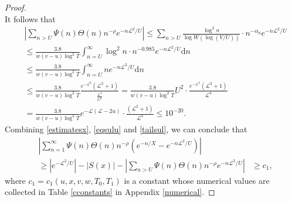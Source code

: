 \documentclass[reqno]{amsart}
\numberwithin{equation}{section}
\theoremstyle{remark}
\begin{document}
\begin{proof}
\[\]
It follows that
  \begin{equation}\label{tailsul}
    \begin{aligned}
        &\left|\sum_{ n> U}\Psi(n)\Theta(n) n^{-\rho}e^{-n \mathscr{L}^2 / U}\right|\le \sum_{ n> U}\frac{\log^2n}{\log W(\log(V/U))}\cdot n^{-\alpha_0} e^{-n \mathscr{L}^2 / U}\\&\le \frac{3.8}{w(v-u)\log^2T}\int_{n=U}^{\infty}\log^2n\cdot  n^{-0.985}e^{-n \mathscr{L}^2 / U}\text{d}n\\&\le  \frac{3.8}{w(v-u)\log^2T}\int_{n=U}^{\infty}ne^{-n \mathscr{L}^2 / U}\text{d}n\\&\le \frac{3.8}{w(v-u)\log^2T}\frac{e^{-\mathscr{L}^2}\left(\mathscr{L}^2+1\right)}{\frac{\mathscr{L}^4}{U^2}}= \frac{3.8}{w(v-u)\log^2T}U^{2}\cdot \frac{e^{-\mathscr{L}^2}\left(\mathscr{L}^2+1\right)}{\mathscr{L}^4}\\&= \frac{3.8}{w(v-u)\log^2T}e^{-\mathscr{L}(\mathscr{L}-2u)}\cdot \frac{\left(\mathscr{L}^2+1\right)}{\mathscr{L}^4}\le 10^{-20}.
    \end{aligned}
\end{equation}
Combining \eqref{estimatesx}, \eqref{eqsulu} and \eqref{tailsul}, we can conclude that
\begin{equation}\label{constinfront}
    \begin{aligned}
        &\left|\sum_{n=1}^{\infty}\Psi(n)\Theta(n) n^{-\rho}\left(e^{-n / X}-e^{-n \mathscr{L}^2 / U}\right)\right|\\&\ge |e^{- \mathscr{L}^2 / U}|-|S(x)|-\left|\sum_{ n> U}\Psi(n)\Theta(n) n^{-\rho}e^{-n \mathscr{L}^2 / U}\right|&\ge c_1,
    \end{aligned}
\end{equation}
where $c_1=c_1(u,x,v,w,T_0,T_1)$ is a constant whose numerical values are collected in Table \ref{cconstants} in Appendix \ref{numerical}.
\end{proof}
\end{document}
